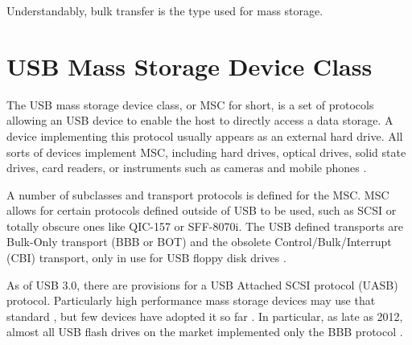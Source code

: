             Understandably, bulk transfer is the type used for mass storage.
            

    \section{USB Mass Storage Device Class}
        The USB mass storage device class, or MSC for short, is a set of protocols allowing an USB device to enable the host to directly access a data storage.  A device implementing this protocol usually appears as an external hard drive.  All sorts of devices implement MSC, including hard drives, optical drives, solid state drives, card readers, or instruments such as cameras and mobile phones \cite{usb-keil-msc}.
        
        A number of subclasses and transport protocols is defined for the MSC.  MSC allows for certain protocols defined outside of USB to be used, such as SCSI or totally obscure ones like QIC-157 or SFF-8070i.  The USB defined transports are Bulk-Only transport (BBB or BOT) and the obsolete Control/Bulk/Interrupt (CBI) transport, only in use for USB floppy disk drives \cite{usb-mass-storage} \cite{usb-mass-bulk}.
        
        As of USB 3.0, there are provisions for a USB Attached SCSI protocol (UASB) protocol.  Particularly high performance mass storage devices may use that standard \cite{usb-electronicdesign-usb-uasp-bot}, but few devices have adopted it so far \cite{usb-winaero-usb-scsi-uas}.  In particular, as late as 2012, almost all USB flash drives on the market implemented only the BBB protocol \cite{usb-qemu-usb-storage}.
        

